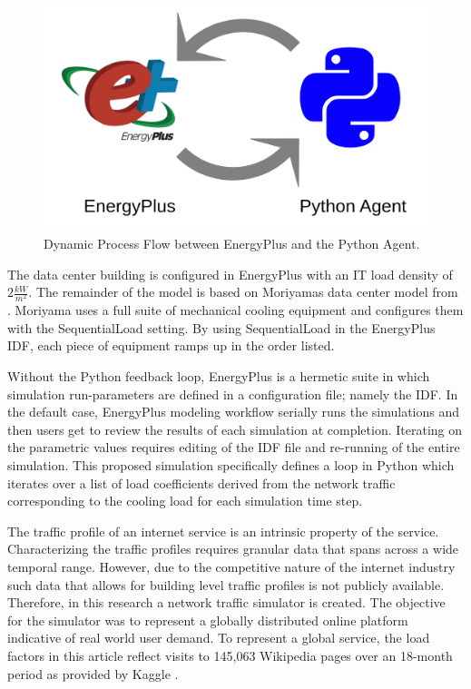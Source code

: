 \documentclass[twocolumn, a4paper,10pt]{article}
\begin{document}
\begin{figure}
\centering
\includegraphics[scale=.10]{img/agent_bem.png}
\caption{Dynamic Process Flow between EnergyPlus and the Python Agent.}
\label{fig:dyna-bem}
\end{figure}

The data center building is configured in EnergyPlus with an IT load density of $2\frac{kW}{m^2}$. The remainder of the model is based on Moriyama\textsc{}s data center model from \citep{moriyama18}. Moriyama uses a full suite of mechanical cooling equipment and configures them with the SequentialLoad setting. By using SequentialLoad in the EnergyPlus IDF, each piece of equipment ramps up in the order listed. 

Without the Python feedback loop, EnergyPlus is a hermetic suite in which simulation run-parameters are defined in a configuration file; namely the IDF. In the default case, EnergyPlus modeling workflow serially runs the simulations and then users get to review the results of each simulation at completion. Iterating on the parametric values requires editing of the IDF file and re-running of the entire simulation. This proposed simulation specifically defines a loop in Python which iterates over a list of load coefficients derived from the network traffic corresponding to the cooling load for each simulation time step.   

The traffic profile of an internet service is an intrinsic property of the service. Characterizing the traffic profiles requires granular data that spans across a wide temporal range. However, due to the competitive nature of the internet industry such data that allows for building level traffic profiles is not publicly available. Therefore, in this research a network traffic simulator is created. The objective for the simulator was to represent a globally distributed online platform indicative of real world user demand. To represent a global service, the load factors in this article reflect visits to 145,063 Wikipedia pages over an 18-month period as provided by Kaggle \citep{kaggle17}.
\end{document}
